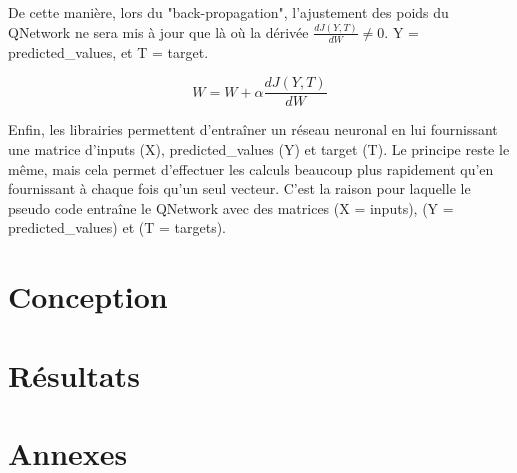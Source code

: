 \documentclass[11pt,a4paper]{report}
\begin{document}
  \par De cette manière, lors du "back-propagation", l'ajustement des poids du QNetwork ne sera mis à jour que là où la dérivée $\frac{dJ(Y,T)}{dW} \neq 0$. Y = predicted\_values, et T = target.
  
  $$W = W + \alpha \frac{dJ(Y,T)}{dW}$$
  
  \par Enfin, les librairies permettent d’entraîner un réseau neuronal en lui fournissant une matrice d'inputs (X), predicted\_values (Y) et target (T). Le principe reste le même, mais cela permet d'effectuer les calculs beaucoup plus rapidement qu'en fournissant à chaque fois qu'un seul vecteur. C'est la raison pour laquelle le pseudo code entraîne le QNetwork avec des matrices (X = inputs), (Y = predicted\_values) et (T = targets). 
  
  
  \chapter{Conception}
  
  \chapter{Résultats}
  
  \chapter{Annexes}
       
\end{document}
